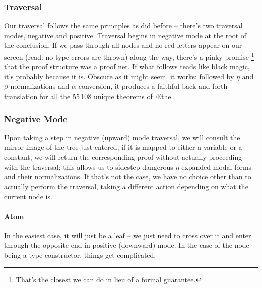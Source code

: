 \subsubsection{Traversal}
Our traversal follows the same principles as did before -- there's two traversal modes, negative and positive.
Traversal begins in negative mode at the root of the conclusion.
If we pass through all nodes and no red letters appear on our screen (read: no type errors are thrown) along the way, there's a pinky promise%
	\footnote{That's the closest we can do in lieu of a formal guarantee.}
that the proof structure was a proof net.
If what follows reads like black magic, it's probably because it is.
Obscure as it might seem, it works: followed by $\eta$ and $\beta$ normalizations and $\alpha$ conversion, it produces a faithful back-and-forth translation for all the 55\,108 unique theorems of \AE thel.


\subsubsection{Negative Mode}
Upon taking a step in negative (upward) mode traversal, we will consult the mirror image of the tree just entered; if it is mapped to either a variable or a constant, we will return the corresponding proof without actually proceeding with the traversal; this allows us to sidestep dangerous $\eta$ expanded modal forms and their normalizations.
If that's not the case, we have no choice other than to actually perform the traversal, taking a different action depending on what the current node is.

\paragraph{Atom}
In the easiest case, it will just be a leaf -- we just need to cross over it and enter through the opposite end in positive (downward) mode.
In the case of the node being a type constructor, things get complicated.


